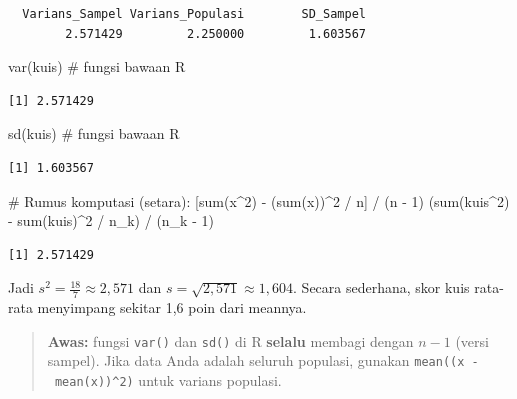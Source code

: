 \documentclass[
  indonesian,
  letterpaper,
]{book}
\newenvironment{Shaded}{\begin{snugshade}}{\end{snugshade}}
\newcommand{\CommentTok}[1]{\textcolor[rgb]{0.37,0.37,0.37}{#1}}
\newcommand{\DecValTok}[1]{\textcolor[rgb]{0.68,0.00,0.00}{#1}}
\newcommand{\FunctionTok}[1]{\textcolor[rgb]{0.28,0.35,0.67}{#1}}
\newcommand{\NormalTok}[1]{\textcolor[rgb]{0.00,0.23,0.31}{#1}}
\newcommand{\SpecialCharTok}[1]{\textcolor[rgb]{0.37,0.37,0.37}{#1}}
\begin{document}
\begin{verbatim}
  Varians_Sampel Varians_Populasi        SD_Sampel 
        2.571429         2.250000         1.603567 
\end{verbatim}

\begin{Shaded}
\begin{Highlighting}[]
\FunctionTok{var}\NormalTok{(kuis)   }\CommentTok{\# fungsi bawaan R}
\end{Highlighting}
\end{Shaded}

\begin{verbatim}
[1] 2.571429
\end{verbatim}

\begin{Shaded}
\begin{Highlighting}[]
\FunctionTok{sd}\NormalTok{(kuis)    }\CommentTok{\# fungsi bawaan R}
\end{Highlighting}
\end{Shaded}

\begin{verbatim}
[1] 1.603567
\end{verbatim}

\begin{Shaded}
\begin{Highlighting}[]
\CommentTok{\# Rumus komputasi (setara): [sum(x\^{}2) {-} (sum(x))\^{}2 / n] / (n {-} 1)}
\NormalTok{(}\FunctionTok{sum}\NormalTok{(kuis}\SpecialCharTok{\^{}}\DecValTok{2}\NormalTok{) }\SpecialCharTok{{-}} \FunctionTok{sum}\NormalTok{(kuis)}\SpecialCharTok{\^{}}\DecValTok{2} \SpecialCharTok{/}\NormalTok{ n\_k) }\SpecialCharTok{/}\NormalTok{ (n\_k }\SpecialCharTok{{-}} \DecValTok{1}\NormalTok{)}
\end{Highlighting}
\end{Shaded}

\begin{verbatim}
[1] 2.571429
\end{verbatim}

Jadi \(s^2 = \frac{18}{7} \approx 2{,}571\) dan
\(s = \sqrt{2{,}571} \approx 1{,}604\). Secara sederhana, skor kuis
rata-rata menyimpang sekitar 1,6 poin dari meannya.

\begin{quote}
\textbf{Awas:} fungsi \texttt{var()} dan \texttt{sd()} di R
\textbf{selalu} membagi dengan \(n-1\) (versi sampel). Jika data Anda
adalah seluruh populasi, gunakan \texttt{mean((x\ -\ mean(x))\^{}2)}
untuk varians populasi.
\end{quote}
\end{document}
